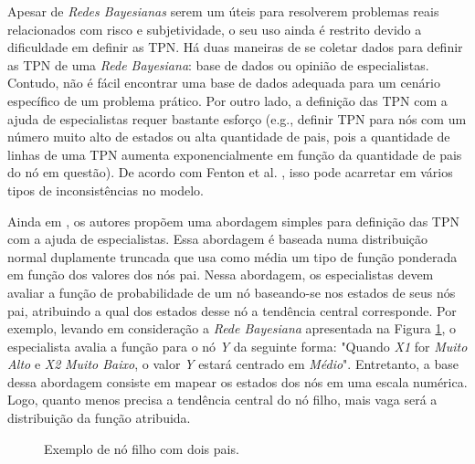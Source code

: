 Apesar de \textit{Redes Bayesianas} serem um úteis para resolverem problemas reais relacionados com risco e subjetividade, o seu uso ainda é restrito devido a dificuldade em definir as TPN. Há duas maneiras de se coletar dados para definir as TPN de uma \textit{Rede Bayesiana}: base de dados ou opinião de especialistas. Contudo, não é fácil encontrar uma base de dados adequada para um cenário específico de um problema prático. Por outro lado, a definição das TPN com a ajuda de especialistas requer bastante esforço (e.g., definir TPN para nós com um número muito alto de estados ou alta quantidade de pais, pois a quantidade de linhas de uma TPN aumenta exponencialmente em função da quantidade de pais do nó em questão). De acordo com Fenton et al. \cite{fenton}, isso pode acarretar em vários tipos de inconsistências no modelo.

Ainda em \cite{fenton}, os autores propõem uma abordagem simples para definição das TPN com a ajuda de especialistas. Essa abordagem é baseada numa distribuição normal duplamente truncada que usa como média um tipo de função ponderada em função dos valores dos nós pai. Nessa abordagem, os especialistas devem avaliar a função de probabilidade de um nó baseando-se nos estados de seus nós pai, atribuindo a qual dos estados desse nó a tendência central corresponde. Por exemplo, levando em consideração a \textit{Rede Bayesiana} apresentada na Figura \ref{funcoes:bn1}, o especialista avalia a função para o nó \textit{Y} da seguinte forma: "Quando \textit{X1} for \textit{Muito Alto} e \textit{X2} \textit{Muito Baixo}, o valor \textit{Y} estará centrado em \textit{Médio}". Entretanto, a base dessa abordagem consiste em mapear os estados dos nós em uma escala numérica. Logo, quanto menos precisa a tendência central do nó filho, mais vaga será a distribuição da função atribuida.

\begin{figure}[ht!]
\begin{center}
	\end{center}
	\caption{Exemplo de nó filho com dois pais.}
	\label{funcoes:bn1}
\end{figure}


